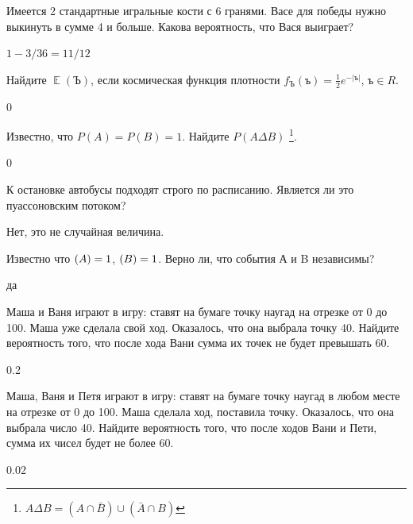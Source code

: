 \documentclass[12pt, addpoints]{exam} %
\DeclareMathOperator{\E}{\mathbb{E}}
\let\P\relax
\DeclareMathOperator{\P}{\mathbb{P}}
\begin{document}
\begin{questions}


\question Имеется 2 стандартные игральные кости с 6 гранями. Васе для победы нужно выкинуть в сумме 4 и больше. Какова вероятность, что Вася выиграет?

\begin{solution}
$1-3/36=11/12$
\end{solution}

\question Найдите $\E(\text{Ъ})$, если космическая функция плотности $f_\text{Ъ}(\text{ъ}) = \frac{1}{2}e^{-|\text{ъ}|}$, $\text{ъ} \in R$.

\begin{solution}
0
\end{solution}

\question Известно, что $P(A) = P(B) = 1$. Найдите $P(A\Delta B)$
\footnote{$A\Delta B = (A \cap \bar B) \cup ( \bar A \cap B)$}.

\begin{solution}
0
\end{solution}

\question К остановке автобусы подходят строго по расписанию. Является ли это пуассоновским потоком?

\begin{solution}
Нет, это не случайная величина.
\end{solution}

\question Известно что $\P(A) = 1$, $\P(B)=1$. Верно ли, что события А и B независимы?

\begin{solution}
 да
\end{solution}

\question Маша и Ваня играют в игру: ставят на бумаге точку наугад на отрезке от 0 до 100. Маша уже сделала свой ход. Оказалось, что она выбрала точку 40. Найдите вероятность того, что после хода Вани сумма их точек не будет превышать 60.

\begin{solution}
 0.2
\end{solution}

\question Маша, Ваня и Петя играют в игру: ставят на бумаге точку наугад в любом месте на отрезке от 0 до 100. Маша сделала ход, поставила точку. Оказалось, что она выбрала число 40. Найдите вероятность того, что после ходов Вани и Пети, сумма их чисел будет не более 60.

\begin{solution}
 0.02
\end{solution}


\end{questions}
\end{document}
